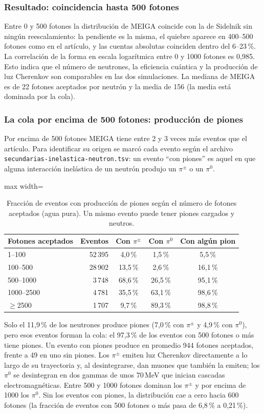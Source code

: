 \documentclass[11pt,a4paper]{article}
\begin{document}
\subsubsection{Resultado: coincidencia hasta 500 fotones}
Entre 0 y 500 fotones la distribución de MEIGA coincide con la de Sidelnik sin ningún reescalamiento: la pendiente es la misma, el quiebre aparece en 400--500 fotones como en el artículo,
y las cuentas absolutas coinciden dentro del 6--23\,\%. La correlación de la forma en escala logarítmica entre 0 y 1000 fotones es 0,985.
Esto indica que el número de neutrones, la eficiencia cuántica y la producción de luz Cherenkov son comparables en las dos simulaciones.
La mediana de MEIGA es de 22 fotones aceptados por neutrón y la media de 156 (la media está dominada por la cola).
\subsubsection{La cola por encima de 500 fotones: producción de piones}
Por encima de 500 fotones MEIGA tiene entre 2 y 3 veces más eventos que el artículo. Para identificar su origen se marcó cada evento según el archivo
\texttt{secundarias-inelastica-neutron.tsv}: un evento ``con piones'' es aquel en que alguna interacción inelástica de un neutrón produjo un $\pi^\pm$ o un $\pi^0$.
\begin{table}[H]\centering\small\begin{adjustbox}{max width=\linewidth}\begin{tabular}{lrccc}\toprule
Fotones aceptados & Eventos & Con $\pi^\pm$ & Con $\pi^0$ & Con algún pion \\\midrule
1--100 & 52\,395 & 4,0\,\% & 1,5\,\% & 5,5\,\% \\
100--500 & 28\,902 & 13,5\,\% & 2,6\,\% & 16,1\,\% \\
500--1000 & 3\,748 & 68,6\,\% & 26,5\,\% & 95,1\,\% \\
1000--2500 & 4\,781 & 35,5\,\% & 63,1\,\% & 98,6\,\% \\
$\geq$2500 & 1\,707 & 9,7\,\% & 89,3\,\% & 98,8\,\% \\
\bottomrule\end{tabular}\end{adjustbox}\caption{Fracción de eventos con producción de piones según el número de fotones aceptados (agua pura). Un mismo evento puede tener piones cargados y neutros.}\end{table}
Solo el 11,9\,\% de los neutrones produce piones (7,0\,\% con $\pi^\pm$ y 4,9\,\% con $\pi^0$),
pero esos eventos forman la cola: el 97,3\,\% de los eventos con 500 fotones o más tiene piones. Un evento con piones produce en promedio
944 fotones aceptados, frente a 49 en uno sin piones. Los $\pi^\pm$ emiten luz Cherenkov directamente a lo largo de su trayectoria
y, al desintegrarse, dan muones que también la emiten; los $\pi^0$ se desintegran en dos gammas de unos 70\,MeV que inician cascadas electromagnéticas. Entre 500 y 1000 fotones dominan los $\pi^\pm$ y por encima de 1000 los $\pi^0$.
Sin los eventos con piones, la distribución cae a cero hacia 600 fotones (la fracción de eventos con 500 fotones o más pasa de 6,8\,\% a 0,21\,\%).
\end{document}
